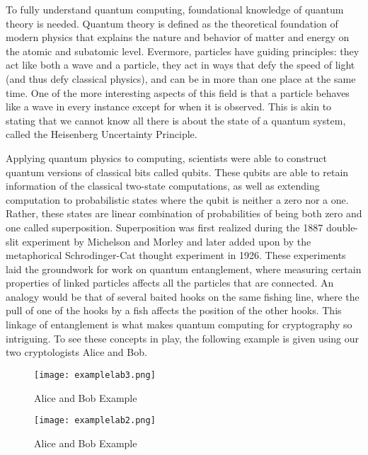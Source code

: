 \documentclass[12pt]{article}
\begin{document}
To fully understand quantum computing, foundational knowledge of quantum theory is needed. Quantum theory is defined as the theoretical foundation of modern physics that explains the nature and behavior of matter and energy on the atomic and subatomic level\cite{quantumdef}. Evermore, particles have guiding principles: they act like both a wave and a particle, they act in ways that defy the speed of light (and thus defy classical physics), and can be in more than one place at the same time. One of the more interesting aspects of this field is that a particle behaves like a wave in every instance except for when it is observed. This is akin to stating that we cannot know all there is about the state of a quantum system, called the Heisenberg Uncertainty Principle. 
\par\vspace{1mm}
Applying quantum physics to computing, scientists were able to construct quantum versions of classical bits called qubits. These qubits are able to retain information of the classical two-state computations, as well as extending computation to probabilistic states where the qubit is neither a zero nor a one. Rather, these states are linear combination of probabilities of being both zero and one called superposition\cite{superpos1}. Superposition was first realized during the 1887 double-slit experiment by Michelson and Morley and later added upon by the metaphorical Schrodinger-Cat thought experiment in 1926\cite{superpos1}. These experiments laid the groundwork for work on quantum entanglement, where measuring certain properties of linked particles affects all the particles that are connected. An analogy would be that of several baited hooks on the same fishing line, where the pull of one of the hooks by a fish affects the position of the other hooks. This linkage of entanglement is what makes quantum computing for cryptography so intriguing. To see these concepts in play, the following example is given using our two cryptologists Alice and Bob. 
	\par\vspace{1mm}

\begin{figure}[h]
\caption{Alice and Bob Example \cite{example}}
\centering
\texttt{[image: examplelab3.png]}
\end{figure}
\begin{figure}[h]
\caption{Alice and Bob Example \cite{example}}
\centering
\texttt{[image: examplelab2.png]}
\end{figure}
\end{document}
